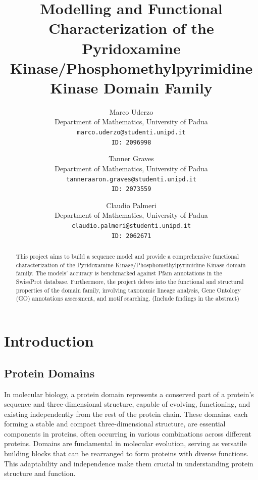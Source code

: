 \documentclass[10pt,twocolumn,letterpaper]{article}
\begin{document}

\title{Modelling and Functional Characterization of the Pyridoxamine Kinase/Phosphomethylpyrimidine Kinase Domain Family}

\author{
Marco Uderzo\\
{\small Department of Mathematics, University of Padua}\\
{\tt\small marco.uderzo@studenti.unipd.it}\\
{\tt\small ID: 2096998} \\
\and
Tanner Graves\\
{\small Department of Mathematics, University of Padua}\\
{\tt\small tanneraaron.graves@studenti.unipd.it}\\
{\tt\small ID: 2073559} \\
\and
Claudio Palmeri \\
{\small Department of Mathematics, University of Padua}\\
{\tt\small claudio.palmeri@studenti.unipd.it}\\
{\tt\small ID: 2062671} \\
}


\maketitle


\begin{abstract}
    This project aims to build a sequence model and provide a comprehensive functional characterization of the Pyridoxamine Kinase/Phosphomethylpyrimidine Kinase domain family. The models' accuracy is benchmarked against Pfam annotations in the SwissProt database. Furthermore, the project delves into the functional and structural properties of the domain family, involving taxonomic lineage analysis, Gene Ontology (GO) annotations assessment, and motif searching. (Include findings in the abstract)
\end{abstract}

\section{Introduction}

\subsection{Protein Domains}

In molecular biology, a protein domain represents a conserved part of a protein's sequence and three-dimensional structure, capable of evolving, functioning, and existing independently from the rest of the protein chain. These domains, each forming a stable and compact three-dimensional structure, are essential components in proteins, often occurring in various combinations across different proteins. Domains are fundamental in molecular evolution, serving as versatile building blocks that can be rearranged to form proteins with diverse functions. This adaptability and independence make them crucial in understanding protein structure and function.
\end{document}
